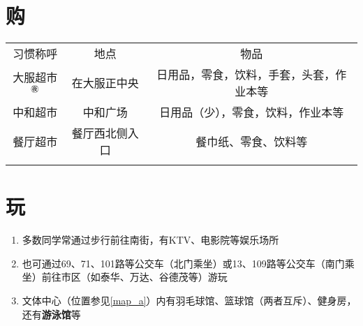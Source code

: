 \section[购]{购}
\label{market}
\begin{table}[H]
    \centering
    \begin{tabular}{|c|c|c|}
        \Xhline{1.2pt}
        习惯称呼       & 地点      & 物品                   \\
        \Xhline{1.2pt}
        大服超市$^{㊰}$ & 在大服正中央  & 日用品，零食，饮料，手套，头套，作业本等 \\
        \hline
        中和超市       & 中和广场    & 日用品（少），零食，饮料，作业本等    \\
        \hline
        餐厅超市       & 餐厅西北侧入口 & 餐巾纸、零食、饮料等           \\
        \Xhline{1.2pt}
    \end{tabular}
\end{table}

\section[玩]{玩}
\begin{enumerate}
    \item 多数同学常通过步行前往南街，有KTV、电影院等娱乐场所
    \item 也可通过69、71、101路等公交车（北门乘坐）或13、109路等公交车（南门乘坐）前往市区（如泰华、万达、谷德茂等）游玩
    \item 文体中心（位置参见\uline{\ref{map_a}}）内有羽毛球馆、篮球馆（两者互斥）、健身房，还有\textbf{游泳馆}等\footnotemark
\end{enumerate}


